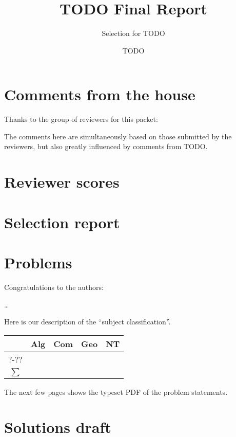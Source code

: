 \documentclass[11pt]{scrreprt}
\begin{document}
\title{TODO Final Report}
\subtitle{Selection for TODO}
\author{TODO}
\maketitle

\tableofcontents

\chapter{Comments from the house}
Thanks to the group of reviewers for this packet:



The comments here are simultaneously based on those submitted by the reviewers,
but also greatly influenced by comments from TODO.



\chapter{Reviewer scores}
\setlength\tabcolsep{5pt}


\chapter{Selection report}
\chapter{Problems}
Congratulations to the authors:
\begin{description}
  \ii[\dots] \dots
\end{description}

Here is our description of the ``subject classification''.


\begin{center}
  \begin{tabular}[h]{c rrrr}
    \toprule
    & Alg & Com & Geo & NT \\
    \midrule
    ?-?? &      &      &      &      \\
    \midrule
    $\sum$  &      &      &      &      \\
    \bottomrule
  \end{tabular}
\end{center}

The next few pages
shows the typeset PDF of the problem statements.

% 
% 

\chapter{Solutions draft}
\end{document}

